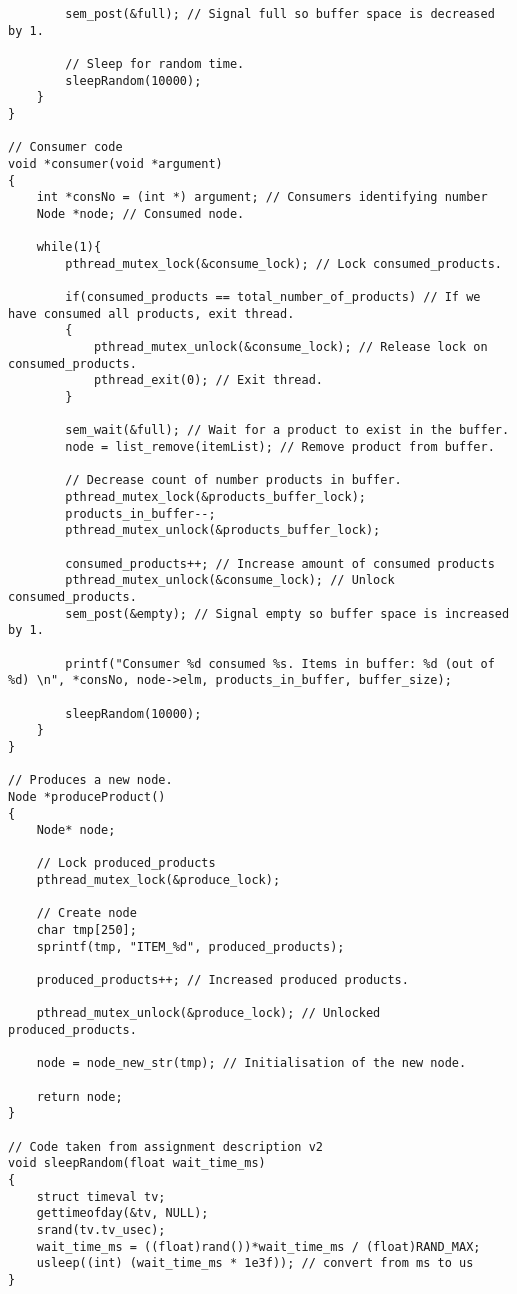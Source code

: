 \begin{lstlisting}
		sem_post(&full); // Signal full so buffer space is decreased by 1.
		
		// Sleep for random time.
		sleepRandom(10000);
	}
}

// Consumer code
void *consumer(void *argument)
{
	int *consNo = (int *) argument; // Consumers identifying number
	Node *node; // Consumed node.
	
	while(1){
		pthread_mutex_lock(&consume_lock); // Lock consumed_products.
		
		if(consumed_products == total_number_of_products) // If we have consumed all products, exit thread.
		{
			pthread_mutex_unlock(&consume_lock); // Release lock on consumed_products.
			pthread_exit(0); // Exit thread.
		}
		
		sem_wait(&full); // Wait for a product to exist in the buffer.
		node = list_remove(itemList); // Remove product from buffer.

		// Decrease count of number products in buffer.
		pthread_mutex_lock(&products_buffer_lock);
		products_in_buffer--;
		pthread_mutex_unlock(&products_buffer_lock);
		
		consumed_products++; // Increase amount of consumed products
		pthread_mutex_unlock(&consume_lock); // Unlock consumed_products.
		sem_post(&empty); // Signal empty so buffer space is increased by 1.

		printf("Consumer %d consumed %s. Items in buffer: %d (out of %d) \n", *consNo, node->elm, products_in_buffer, buffer_size);
		
		sleepRandom(10000);
	}
}

// Produces a new node.
Node *produceProduct()
{
	Node* node;
	
	// Lock produced_products
	pthread_mutex_lock(&produce_lock);

	// Create node
	char tmp[250];
	sprintf(tmp, "ITEM_%d", produced_products);
	
	produced_products++; // Increased produced products.

	pthread_mutex_unlock(&produce_lock); // Unlocked produced_products.
	
	node = node_new_str(tmp); // Initialisation of the new node.
	
	return node;
}

// Code taken from assignment description v2
void sleepRandom(float wait_time_ms)
{
	struct timeval tv;
	gettimeofday(&tv, NULL);
	srand(tv.tv_usec);
	wait_time_ms = ((float)rand())*wait_time_ms / (float)RAND_MAX;
	usleep((int) (wait_time_ms * 1e3f)); // convert from ms to us
}
\end{lstlisting}